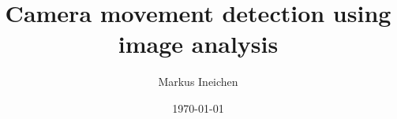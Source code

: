 \documentclass[11pt,a4paper]{scrreprt}
\begin{document}
	\setlength\parindent{0pt} 
	
	\titlehead{MID SWEDEN UNIVERSITY \\ 
		Information and Communication Systems}
	\subject{Report}
	\title{Camera movement detection using image analysis}
	\author{Markus Ineichen }
	\date{\today}
	
	\maketitle
	
	\renewcommand{\contentsname}{Contents}
	
	\tableofcontents
	
	\cleardoublepage

	
	
	
	
	
	
\end{document}
